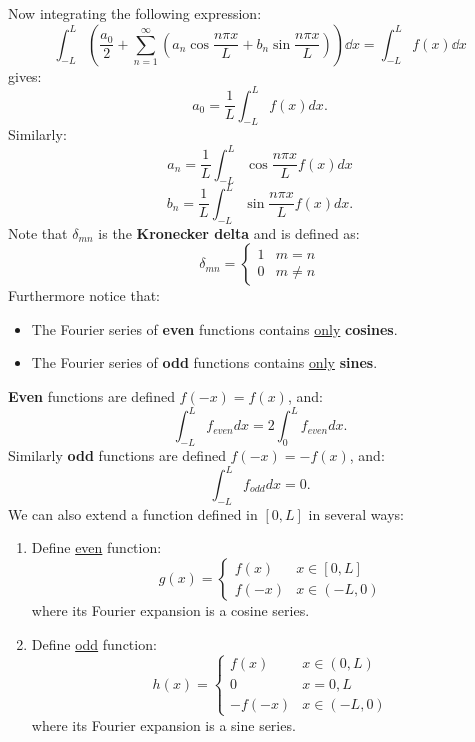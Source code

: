 \documentclass{article}
\begin{document}
Now integrating the following expression:
$$\int_{-L}^{L}\left(\frac{a_0}{2}+\sum_{n=1}^{\infty}
(a_n \cos\frac{n\pi x}{L}+b_n \sin\frac{n\pi x}{L})\right)\dd x
=\int_{-L}^{L}f(x)\dd x$$
gives:
$$a_0=\frac{1}{L}\int_{-L}^{L}f(x)dx.$$
Similarly:
$$a_n=\frac{1}{L}\int_{-L}^{L}\cos\frac{n\pi x}{L}f(x)dx$$
$$b_n=\frac{1}{L}\int_{-L}^{L}\sin\frac{n\pi x}{L}f(x)dx.$$
Note that $\delta_{mn}$ is the \textbf{Kronecker delta} and is defined as:
$$\delta_{mn} =
\left\{
\begin{array}{ll}
	1  & \mbox{} m=n \\
	0 & \mbox{} m\neq n
\end{array}
\right.$$
Furthermore notice that:
\begin{itemize}
    \item The Fourier series of \textbf{even} functions contains \underline{only} \textbf{cosines}.

    \item The Fourier series of \textbf{odd} functions contains \underline{only} \textbf{sines}.
\end{itemize}
\textbf{Even} functions are defined $f(-x)=f(x)$, and:
$$\int_{-L}^{L}f_{even}dx=2\int_{0}^{L}f_{even}dx.$$
Similarly \textbf{odd} functions are defined $f(-x)=-f(x)$, and:
$$\int_{-L}^{L}f_{odd}dx=0.$$
We can also extend a function defined in $[0,L]$ in several ways:
\begin{enumerate}
    \item Define \underline{even} function:
    $$g(x)=
    \left\{
    \begin{array}{ll}
        f(x)  & \mbox{} x\in[0,L] \\
        f(-x) & \mbox{} x\in(-L,0)
    \end{array}
    \right.$$
    where its Fourier expansion is a cosine series.
    
    \item Define \underline{odd} function:
    $$h(x)=
    \left\{
    \begin{array}{ll}
        f(x)  & \mbox{} x\in(0,L) \\
        0 & x=0,L \\
        -f(-x) & \mbox{} x\in(-L,0)
    \end{array}
    \right.$$
    where its Fourier expansion is a sine series.
\end{enumerate}

\newpage
\end{document}
